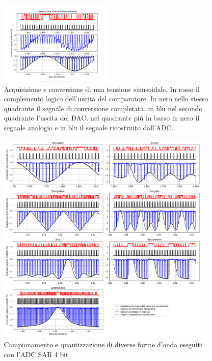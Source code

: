 \documentclass[journal]{IEEEtran}
\begin{document}
\begin{figure}[H]%
\begin{center}
\includegraphics[trim = {0 25 0 0},clip, width=0.50\textwidth]{analysis/output/direct_aq_waveforms.pdf}
\caption{Acquisizione e conversione di una tensione sinusoidale. In rosso il complemento logico dell'uscita del comparatore. In nero nello stesso quadrante il segnale di conversione completata, in blu nel secondo quadrante l'uscita del DAC, nel quadrante più in basso in nero il segnale analogio e in blu il segnale ricostruito dall'ADC.}
\label{fig:Direct_aq_waveforms}
\end{center}
\end{figure}

\begin{figure}[t]%
\centering
\includegraphics[trim = {30 0 50 0}, width=0.95\textwidth]{analysis/output/waveforms.pdf}
\caption{Campionamento e quantizzazione di diverse forme d'onda eseguiti con l'ADC SAR 4 bit}
\label{fig:waveforms_no_sh_scope}
\end{figure}
\end{document}
